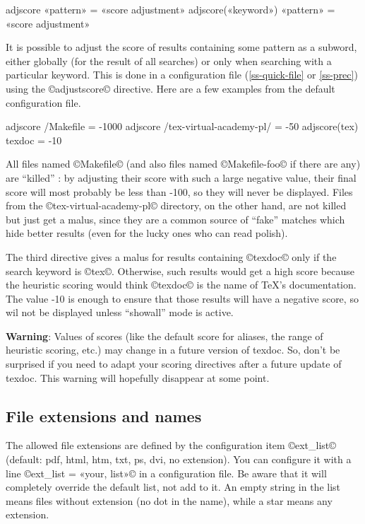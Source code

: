 \documentclass[a4paper, oneside]{scrartcl}
\makeatletter
\newcommand\tex{\TeX\xspace}
\newenvironment{htcode}{%
  \SaveVerbatim[samepage, gobble=2]{verbmat}%
  }{%
  \endSaveVerbatim
  \par\medskip\noindent\hspace*{\parindent}%
  \BUseVerbatim{verbmat}%
  \par\medskip\@endpetrue}
\makeatother
\begin{document}
\begin{htcode}
  adjscore «pattern» = «score adjustment»
  adjscore(«keyword») «pattern» = «score adjustment»
\end{htcode}

It is possible to adjust the score of results containing some pattern as a
subword, either globally (for the result of all searches) or only when
searching with a particular keyword. This is done in a configuration file
(\ref{ss-quick-file} or \ref{ss-prec}) using the ©adjustscore© directive. Here
are a few examples from the default configuration file.

\begin{htcode}
  adjscore /Makefile = -1000
  adjscore /tex-virtual-academy-pl/ = -50
  adjscore(tex) texdoc = -10
\end{htcode}

All files named ©Makefile© (and also files named ©Makefile-foo© if there are
any) are ``killed'' : by adjusting their score with such a large negative
value, their final score will most probably be less than -100, so they will
never be displayed. Files from the ©tex-virtual-academy-pl© directory, on the
other hand, are not killed but just get a malus, since they are a common
source of ``fake'' matches which hide better results (even for the lucky ones
who can read polish).

The third directive gives a malus for results containing ©texdoc© only if the
search keyword is ©tex©. Otherwise, such results would get a high score
because the heuristic scoring would think ©texdoc© is the name of \tex's
documentation. The value -10 is enough to ensure that those results will have
a negative score, so wil not be displayed unless ``showall'' mode is active.

\textbf{Warning}: Values of scores (like the default score for aliases, the
range of heuristic scoring, etc.) may change in a future version of texdoc.
So, don't be surprised if you need to adapt your scoring directives after a
future update of texdoc.  This warning will hopefully disappear at some point.

\subsection{File extensions and names}\label{ss-ext}

The allowed file extensions are defined by the configuration item ©ext_list©
(default: pdf, html, htm, txt, ps, dvi, no extension). You can configure it
with a line ©ext_list = «your, list»© in a configuration file. Be aware
that it will completely override the default list, not add to it. An empty
string in the list means files without extension (no dot in the name), while a
star means any extension.
\end{document}

